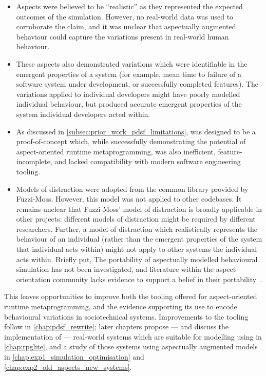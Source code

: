 \begin{itemize}
    \item Aspects were believed to be ``realistic'' as they represented the
    expected outcomes of the simulation. However, no real-world data was used to
    corroborate the claim, and it was unclear that aspectually augmented
    behaviour could capture the variations present in real-world human
    behaviour.
    \item These aspects also demonstrated variations which were identifiable in
    the emergent properties of a system (for example, mean time to failure of a
    software system under development, or successfully completed features). The
    variations applied to individual developers might have poorly modelled
    individual behaviour, but produced accurate emergent properties of the
    system individual developers acted within.
    \item As discussed in \cref{subsec:prior_work_pdsf_limitations}, \pydysofu
    was designed to be a proof-of-concept which, while successfully
    demonstrating the potential of aspect-oriented runtime metaprogramming, was
    also inefficient, feature-incomplete, and lacked compatibility with modern
    software engineering tooling.
    \item Models of distraction were adopted from the common library provided by
    Fuzzi-Moss. However, this model was not applied to other codebases. It
    remains unclear that Fuzzi-Moss' model of distraction is broadly applicable
    in other projects: different models of distraction might be required by
    different researchers. Further, a model of distraction which realistically
    represents the behaviour of an individual (rather than the emergent
    properties of the system that individual acts within) might not apply to
    other systems the individual acts within. Briefly put, The portability of
    aspectually modelled behavioural simulation has not been investigated, and
    literature within the aspect orientation community lacks evidence to support
    a belief in their portability~\cite{przybylek2010wrong,Constantinides04aopconsidered,steimann06paradoxical}.
\end{itemize}

This leaves opportunities to improve both the tooling offered for aspect-oriented
runtime metaprogramming, and the evidence supporting its use to encode
behavioural variations in sociotechnical systems. Improvements to the tooling
follow in \cref{chap:pdsf_rewrite}; later chapters propose --- and discuss the
implementation of --- real-world systems which are suitable for modelling using
\pydysofu{} in \cref{chap:rpglite}, and a study of those systems using aspectually
augmented models in \cref{chap:exp1_simulation_optimisation} and \cref{chap:exp2_old_aspects_new_systems}.
